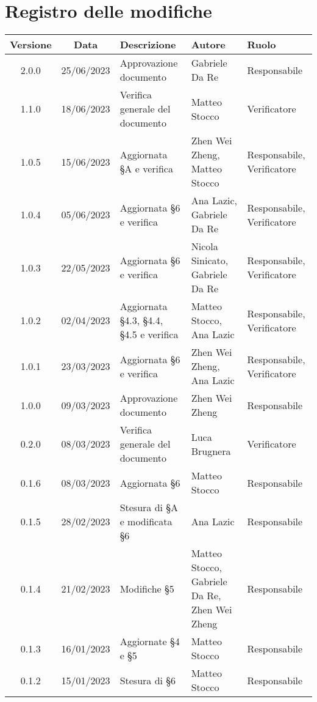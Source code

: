 \section*{Registro delle modifiche}
\begin{center}
	\renewcommand\tabularxcolumn[1]{>{\Centering}m{#1}}
	\setlength\extrarowheight{5pt}
	\begin{tabularx}{\textwidth}{| c | c | X | X | X |} 
		\hline
		\rowcolor{white}
		\textbf{Versione} & \textbf{Data} & \textbf{Descrizione} & 	\textbf{Autore} & \textbf{Ruolo}\\
		\hline
	 	2.0.0 & 25/06/2023 & Approvazione documento & Gabriele Da Re & Responsabile \\
		\hline
	 	1.1.0 & 18/06/2023 & Verifica generale del documento & Matteo Stocco & Verificatore \\
		\hline
		1.0.5 & 15/06/2023 & Aggiornata §A e verifica & Zhen Wei Zheng, Matteo Stocco & Responsabile, Verificatore \\
		\hline
	 	1.0.4 & 05/06/2023 & Aggiornata §6 e verifica & Ana Lazic, Gabriele Da Re & Responsabile, Verificatore \\
		\hline
	 	1.0.3 & 22/05/2023 & Aggiornata §6 e verifica & Nicola Sinicato, Gabriele Da Re & Responsabile, Verificatore\\
		\hline
		1.0.2 & 02/04/2023 & Aggiornata §4.3, §4.4, §4.5 e verifica & Matteo Stocco, Ana Lazic & Responsabile, Verificatore \\
		\hline
	 	1.0.1 & 23/03/2023 & Aggiornata §6 e verifica & Zhen Wei Zheng, Ana Lazic & Responsabile, Verificatore \\
		\hline
	 	1.0.0 & 09/03/2023 & Approvazione documento & Zhen Wei Zheng & Responsabile \\
		\hline
		0.2.0 & 08/03/2023 & Verifica generale del documento & Luca Brugnera & Verificatore \\
		\hline
		0.1.6 & 08/03/2023 & Aggiornata §6 & Matteo Stocco & Responsabile \\
        	\hline
		0.1.5 & 28/02/2023 & Stesura di §A e modificata §6 & Ana Lazic & Responsabile \\
        	\hline
		0.1.4 & 21/02/2023 & Modifiche §5 & Matteo Stocco, Gabriele Da Re, Zhen Wei Zheng & Responsabile \\
		\hline
		0.1.3 & 16/01/2023 & Aggiornate §4 e §5 & Matteo Stocco & Responsabile \\
		\hline
		0.1.2 & 15/01/2023 & Stesura di §6 & Matteo Stocco & Responsabile \\

\end{tabularx}
\end{center}

